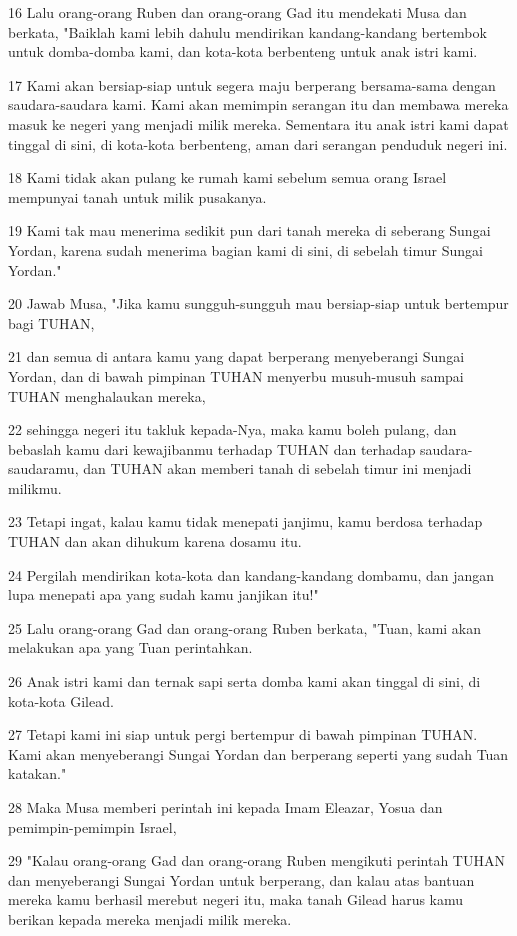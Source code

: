 \par 16 Lalu orang-orang Ruben dan orang-orang Gad itu mendekati Musa dan berkata, "Baiklah kami lebih dahulu mendirikan kandang-kandang bertembok untuk domba-domba kami, dan kota-kota berbenteng untuk anak istri kami.
\par 17 Kami akan bersiap-siap untuk segera maju berperang bersama-sama dengan saudara-saudara kami. Kami akan memimpin serangan itu dan membawa mereka masuk ke negeri yang menjadi milik mereka. Sementara itu anak istri kami dapat tinggal di sini, di kota-kota berbenteng, aman dari serangan penduduk negeri ini.
\par 18 Kami tidak akan pulang ke rumah kami sebelum semua orang Israel mempunyai tanah untuk milik pusakanya.
\par 19 Kami tak mau menerima sedikit pun dari tanah mereka di seberang Sungai Yordan, karena sudah menerima bagian kami di sini, di sebelah timur Sungai Yordan."
\par 20 Jawab Musa, "Jika kamu sungguh-sungguh mau bersiap-siap untuk bertempur bagi TUHAN,
\par 21 dan semua di antara kamu yang dapat berperang menyeberangi Sungai Yordan, dan di bawah pimpinan TUHAN menyerbu musuh-musuh sampai TUHAN menghalaukan mereka,
\par 22 sehingga negeri itu takluk kepada-Nya, maka kamu boleh pulang, dan bebaslah kamu dari kewajibanmu terhadap TUHAN dan terhadap saudara-saudaramu, dan TUHAN akan memberi tanah di sebelah timur ini menjadi milikmu.
\par 23 Tetapi ingat, kalau kamu tidak menepati janjimu, kamu berdosa terhadap TUHAN dan akan dihukum karena dosamu itu.
\par 24 Pergilah mendirikan kota-kota dan kandang-kandang dombamu, dan jangan lupa menepati apa yang sudah kamu janjikan itu!"
\par 25 Lalu orang-orang Gad dan orang-orang Ruben berkata, "Tuan, kami akan melakukan apa yang Tuan perintahkan.
\par 26 Anak istri kami dan ternak sapi serta domba kami akan tinggal di sini, di kota-kota Gilead.
\par 27 Tetapi kami ini siap untuk pergi bertempur di bawah pimpinan TUHAN. Kami akan menyeberangi Sungai Yordan dan berperang seperti yang sudah Tuan katakan."
\par 28 Maka Musa memberi perintah ini kepada Imam Eleazar, Yosua dan pemimpin-pemimpin Israel,
\par 29 "Kalau orang-orang Gad dan orang-orang Ruben mengikuti perintah TUHAN dan menyeberangi Sungai Yordan untuk berperang, dan kalau atas bantuan mereka kamu berhasil merebut negeri itu, maka tanah Gilead harus kamu berikan kepada mereka menjadi milik mereka.
